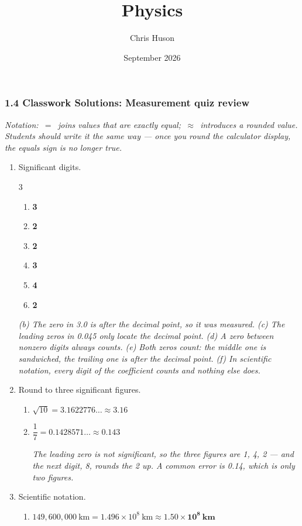 \documentclass[12pt, twoside]{article}
\title{Physics}
\author{Chris Huson}
\date{September 2026}
\begin{document}
\subsubsection*{1.4 Classwork Solutions: Measurement quiz review}

\emph{Notation: \,$=$\, joins values that are exactly equal; \,$\approx$\, introduces a
rounded value. Students should write it the same way --- once you round the calculator
display, the equals sign is no longer true.}

\begin{enumerate}[itemsep=0.3cm]

\item Significant digits.
  \begin{multicols}{3}
    \begin{enumerate}[itemsep=0.1cm]
      \item \textbf{3}
      \item \textbf{2}
      \item \textbf{2}
      \item \textbf{3}
      \item \textbf{4}
      \item \textbf{2}
    \end{enumerate}
  \end{multicols}
  \emph{(b) The zero in 3.0 is after the decimal point, so it was measured. (c) The
  leading zeros in 0.045 only locate the decimal point. (d) A zero between nonzero
  digits always counts. (e) Both zeros count: the middle one is sandwiched, the trailing
  one is after the decimal point. (f) In scientific notation, every digit of the
  coefficient counts and nothing else does.}

\item Round to three significant figures.
  \begin{enumerate}[itemsep=0.15cm]
    \item $\sqrt{10} = 3.1622776\ldots \approx \mathbf{3.16}$
    \item $\dfrac{1}{7} = 0.1428571\ldots \approx \mathbf{0.143}$

      \emph{The leading zero is not significant, so the three figures are 1, 4, 2 ---
      and the next digit, 8, rounds the 2 up. A common error is 0.14, which is only two
      figures.}
  \end{enumerate}

\item Scientific notation.
  \begin{enumerate}[itemsep=0.15cm]
    \item $149{,}600{,}000~\text{km} = 1.496 \times 10^{8}~\text{km}
      \approx \mathbf{1.50 \times 10^{8}~\textbf{km}}$


\end{enumerate}
\end{enumerate}
\end{document}
